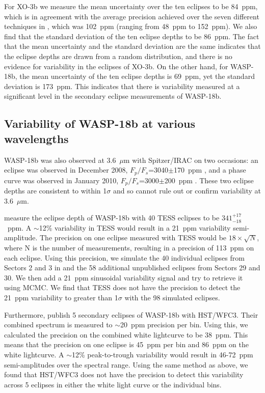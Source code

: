 For XO-3b we measure the mean uncertainty over the ten eclipses to be 84~ppm, which is in agreement with the average precision achieved over the seven different techniques in \citet{Ingalls2016}, which was 102~ppm (ranging from 48~ppm to 152~ppm). We also find that the standard deviation of the ten eclipse depths to be 86~ppm. The fact that the mean uncertainty and the standard deviation are the same indicates that the eclipse depths are drawn from a random distribution, and there is no evidence for variability in the eclipses of XO-3b. On the other hand, for WASP-18b, the mean uncertainty of the ten eclipse depths is 69~ppm, yet the standard deviation is 173~ppm. This indicates that there is variability measured at a significant level in the secondary eclipse measurements of WASP-18b.

\subsection{Variability of WASP-18b at various wavelengths}

WASP-18b was also observed at 3.6~$\mu$m with Spitzer/IRAC on two occasions: an eclipse was observed in December 2008, $F_p/F_s$=3040$\pm$170~ppm \citep{Nymeyer2011}, and a phase curve was observed in January 2010, $F_p/F_s$=3000$\pm$200~ppm \citep{Maxted2013}. These two eclipse depths are consistent to within 1$\sigma$ and so cannot rule out or confirm variability at 3.6~$\mu$m.

\citet{Shporer2019} measure the eclipse depth of WASP-18b with 40 TESS eclipses to be $341^{+17}_{-18}$~ppm. A $\sim$12\% variability in TESS would result in a 21~ppm variability semi-amplitude. The precision on one eclipse measured with TESS would be $18\times\sqrt{N}$, where N is the number of measurements, resulting in a precision of 113~ppm on each eclipse. Using this precision, we simulate the 40 individual eclipses from Sectors 2 and 3 in \citet{Shporer2019} and the 58 additional unpublished eclipses from Sectors 29 and 30. We then add a 21~ppm sinusoidal variability signal and try to retrieve it using MCMC. We find that TESS does not have the precision to detect the 21~ppm variability to greater than 1$\sigma$ with the 98 simulated eclipses.

Furthermore, \citet{Arcangeli2018} publish 5 secondary eclipses of WASP-18b with HST/WFC3. Their combined spectrum is measured to $\sim$20~ppm precision per bin. Using this, we calculated the precision on the combined white lightcurve to be 38~ppm. This means that the precision on one eclipse is 45~ppm per bin and 86~ppm on the white lightcurve. A $\sim$12\% peak-to-trough variability would result in 46-72~ppm semi-amplitudes over the spectral range. Using the same method as above, we found that HST/WFC3 does not have the precision to detect this variability across 5 eclipses in either the white light curve or the individual bins.

